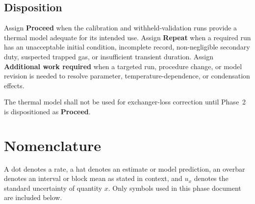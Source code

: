 \documentclass[11pt]{article}
\begin{document}
\subsection{Disposition}

Assign \textbf{Proceed} when the calibration and withheld-validation runs provide a thermal model adequate for its intended use. Assign \textbf{Repeat} when a required run has an unacceptable initial condition, incomplete record, non-negligible secondary duty, suspected trapped gas, or insufficient transient duration. Assign \textbf{Additional work required} when a targeted run, procedure change, or model revision is needed to resolve parameter, temperature-dependence, or condensation effects.

The thermal model shall not be used for exchanger-loss correction until Phase~2 is dispositioned as \textbf{Proceed}.


\clearpage
\appendix
\section{Nomenclature}
\label{sec:nomenclature}
A dot denotes a rate, a hat denotes an estimate or model prediction, an overbar denotes an interval or block mean as stated in context, and $u_x$ denotes the standard uncertainty of quantity $x$. Only symbols used in this phase document are included below.
\end{document}
